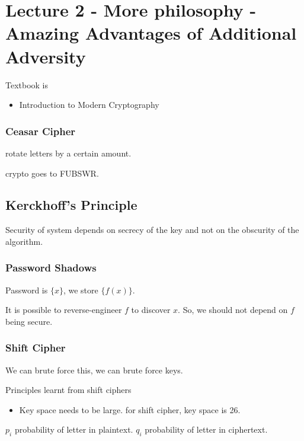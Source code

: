 
\chapter{Lecture 2 - More philosophy - Amazing Advantages of Additional Adversity}

Textbook is
\begin{itemize}
    \item Introduction to Modern Cryptography
\end{itemize}

\subsection{Ceasar Cipher}

rotate letters by a certain amount.

crypto goes to FUBSWR.

\section{Kerckhoff's Principle}
Security of system depends on secrecy of the key and not on the
obscurity of the algorithm.

\subsection{Password Shadows}
Password is $\{x\}$, we store $\{ f(x) \}$.

It is possible to reverse-engineer $f$ to discover $x$. So, we should not depend
on $f$ being secure.

\subsection{}

\subsection{Shift Cipher}

We can brute force this, we can brute force keys.

Principles learnt from shift ciphers
\begin{itemize}
    \item Key space needs to be large. for shift cipher, key space is 26.
\end{itemize}

$p_i$ probability of letter in plaintext.
$q_i$ probability of letter in ciphertext.

